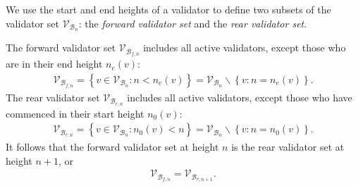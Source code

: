 \documentclass[12pt,a4paper]{article}
\begin{document}
We use the start and end heights of a validator to define two subsets of the validator set $\mathcal{V}_{\mathcal{B}_n}$: the \emph{forward validator set} and the \emph{rear validator set}.

The forward validator set $\mathcal{V}_{\mathcal{B}_{f,n}}$ includes all active validators, except those who are in their end height $n_e(v)$:
\begin{align}
  \mathcal{V}_{\mathcal{B}_{f,n}} = \left\{v \in \mathcal{V}_{\mathcal{B}_{n}}: n < n_e(v) \right\} = \mathcal{V}_{\mathcal{B}_{n}} \backslash \left\{v : n = n_e(v) \right\}.
\end{align}
The rear validator set $\mathcal{V}_{\mathcal{B}_{r,n}}$ includes all active validators, except those who have commenced in their start height $n_0(v)$:
\begin{align}
  \mathcal{V}_{\mathcal{B}_{r,n}} = \left\{v \in \mathcal{V}_{\mathcal{B}_{n}}: n_0(v) < n \right\} = \mathcal{V}_{\mathcal{B}_{n}} \backslash \left\{v : n = n_0(v) \right\}.
\end{align}
It follows that the forward validator set at height $n$ is the rear validator set at height $n+1$, or
\begin{align}
  \label{eq:stitching}
  \mathcal{V}_{\mathcal{B}_{f,n}} = \mathcal{V}_{\mathcal{B}_{r,n+1}}.
\end{align}
 
\end{document}
